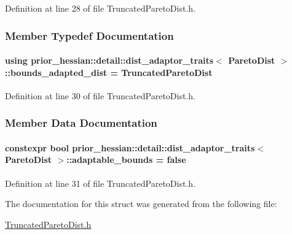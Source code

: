 Definition at line 28 of file Truncated\+Pareto\+Dist.\+h.



\subsubsection{Member Typedef Documentation}
\paragraph[{\texorpdfstring{bounds\+\_\+adapted\+\_\+dist}{bounds_adapted_dist}}]{\setlength{\rightskip}{0pt plus 5cm}using {\bf prior\+\_\+hessian\+::detail\+::dist\+\_\+adaptor\+\_\+traits}$<$ {\bf Pareto\+Dist} $>$\+::{\bf bounds\+\_\+adapted\+\_\+dist} =  {\bf Truncated\+Pareto\+Dist}}\hypertarget{structprior__hessian_1_1detail_1_1dist__adaptor__traits_3_01ParetoDist_01_4_ac747ebd8f37683894901b24971c2afc7}{}\label{structprior__hessian_1_1detail_1_1dist__adaptor__traits_3_01ParetoDist_01_4_ac747ebd8f37683894901b24971c2afc7}


Definition at line 30 of file Truncated\+Pareto\+Dist.\+h.



\subsubsection{Member Data Documentation}
\paragraph[{\texorpdfstring{adaptable\+\_\+bounds}{adaptable_bounds}}]{\setlength{\rightskip}{0pt plus 5cm}constexpr bool {\bf prior\+\_\+hessian\+::detail\+::dist\+\_\+adaptor\+\_\+traits}$<$ {\bf Pareto\+Dist} $>$\+::adaptable\+\_\+bounds = false\hspace{0.3cm}{\ttfamily [static]}}\hypertarget{structprior__hessian_1_1detail_1_1dist__adaptor__traits_3_01ParetoDist_01_4_a3537343291046bc190a3c9afde7043e0}{}\label{structprior__hessian_1_1detail_1_1dist__adaptor__traits_3_01ParetoDist_01_4_a3537343291046bc190a3c9afde7043e0}


Definition at line 31 of file Truncated\+Pareto\+Dist.\+h.



The documentation for this struct was generated from the following file\+:\begin{DoxyCompactItemize}
\item 
\hyperlink{TruncatedParetoDist_8h}{Truncated\+Pareto\+Dist.\+h}\end{DoxyCompactItemize}
